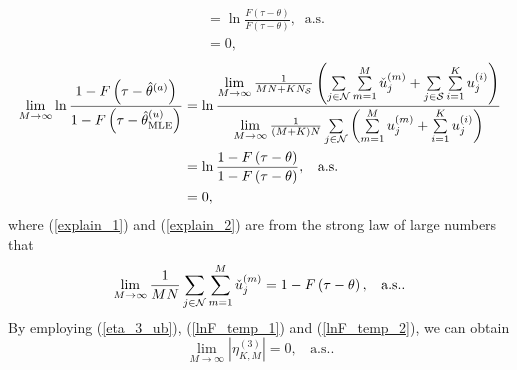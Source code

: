 \documentclass[11pt, draftclsnofoot, onecolumn]{IEEEtran}
\newcommand{\cu}{{\check{u}}}
\begin{document}
\begin{IEEEproof}
\begin{align}
& = \ln \frac{{F\left( {\tau  - \theta } \right)}}{{F\left( {\tau  - \theta } \right)}}, \;\; \text{a.s.}\\ \label{lnF_temp_1}
& = 0,
\end{align}
\begin{align} \notag
\mathop {\lim }\limits_{M \to \infty } \ln \frac{{1 - F\left( {\tau  - {{\hat \theta }^{\left( a \right)}}} \right)}}{{1 - F\left( {\tau  - \hat \theta _{{\rm{MLE}}}^{(u)}} \right)}} & = \ln \frac{{\mathop {\lim }\limits_{M \to \infty } \frac{1}{{MN + K{N_{\cal S}}}}\left( {\sum\limits_{j \in {\cal N}} {\sum\limits_{m = 1}^M {\cu_j^{(m)}} }  + \sum\limits_{j \in {\cal S}} {\sum\limits_{i = 1}^K {u_j^{(i)}} } } \right)}}{{\mathop {\lim }\limits_{M \to \infty } \frac{1}{{\left( {M + K} \right)N}}\sum\limits_{j \in {\cal N}} {\left( {\sum\limits_{m = 1}^M {u_j^{(m)}}  + \sum\limits_{i = 1}^K {u_j^{(i)}} } \right)} }}\\ \label{explain_2}
& = \ln \frac{{1 - F\left( {\tau  - \theta } \right)}}{{1 - F\left( {\tau  - \theta } \right)}}, \;\; \text{ a.s.}\\ \label{lnF_temp_2}
& = 0,
\end{align}
where (\ref{explain_1}) and (\ref{explain_2}) are from the strong law of large numbers that
\begin{equation}
\mathop {\lim }\limits_{M \to \infty } \frac{1}{{MN}}\sum\limits_{j \in {\cal N}} {\sum\limits_{m = 1}^M {\cu_j^{(m)}} }  = 1 - F\left( {\tau  - \theta } \right), \;\; \text{ a.s.}.
\end{equation}
By employing (\ref{eta_3_ub}), (\ref{lnF_temp_1}) and (\ref{lnF_temp_2}), we can obtain
\begin{equation}
\mathop {\lim }\limits_{M \to \infty } \left| {\eta _{K,M}^{(3)}} \right|=0,  \;\; \text{ a.s.}.
\end{equation}

\end{IEEEproof}
\end{document}
